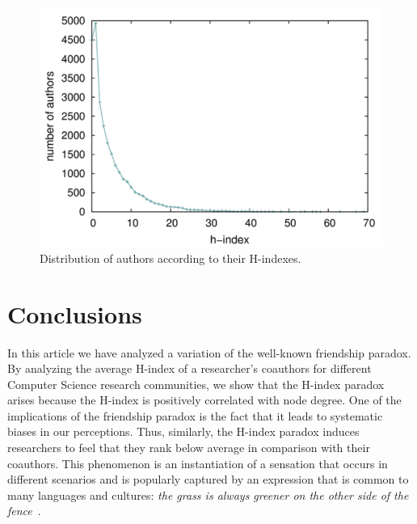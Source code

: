 \documentclass[smallextended]{svjour3}
\begin{document}
\begin{figure}[!htpb]
  \centering
  \includegraphics[width=.88\textwidth]{fig2.pdf}
  \caption{Distribution of authors according to their H-indexes.}
  \label{fig:distrib}
\end{figure}

\section{Conclusions}

In this article we have analyzed a variation of the well-known friendship paradox. By analyzing the average H-index of a researcher's coauthors for different Computer Science research communities, we show that the H-index paradox arises because the H-index is positively correlated with node degree. One of the implications of the friendship paradox is the fact that it leads to systematic biases in our perceptions. Thus, similarly, the H-index paradox induces researchers to feel that they rank below average in comparison with their coauthors.
This phenomenon is an instantiation of a sensation that occurs in different scenarios and is popularly captured by an expression that is common to many languages and cultures: \textit{the grass is always greener on the other side of the fence}~\cite{giansante2007grass}.

\end{document}

